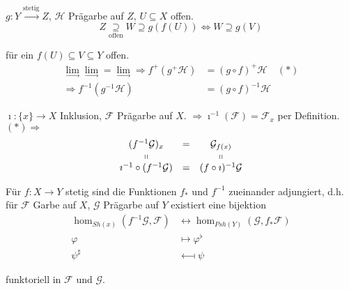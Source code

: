 $g:Y\xrightarrow{\text{stetig}}Z$, $\mathcal{H}$ Prägarbe auf $Z$,
$U\subseteq X$ offen. 
\[
Z\underset{\text{offen}}{\supseteq}W\supseteq g(f(U))\Longleftrightarrow W\supseteq g(V)
\]

für ein $f(U)\subseteq V\subseteq Y$ offen. 
\begin{align*}
  \underset{\longrightarrow}{\lim}\underset{\longrightarrow}{\lim}=\underset{\longrightarrow}{\lim}\Longrightarrow f^{+}(g^{+}\mathcal{H}) & =(g\circ f)^{+}\mathcal{H}\quad(*)\\
  \Longrightarrow f^{-1}(g^{-1}\mathcal{H}) & =(g\circ f)^{-1}\mathcal{H}
\end{align*}

\begin{example}
  $\imath:\{x\}\rightarrow X$ Inklusion, $\mathcal{F}$ Prägarbe auf
  $X$. $\Longrightarrow\imath^{-1}(\mathcal{F})=\mathcal{F}_{x}$ per
  Definition. $(\ast)\Longrightarrow$
  \[
  \begin{array}{ccc}
    (f^{-1}\mathcal{G})_{x} & = & \mathcal{G}_{f(x)}\\
    \shortparallel &  & \shortparallel\\
    \imath^{-1}\circ(f^{-1}\mathcal{G}) & = & (f\circ\imath)^{-1}\mathcal{G}
  \end{array}
  \]
\end{example}

\begin{prop}[29]
  Für $f:X\rightarrow Y$ stetig sind die Funktionen $f_{\ast}$ und
  $f^{-1}$ zueinander adjungiert, d.h. für $\mathcal{F}$ Garbe auf
  $X$, $\mathcal{G}$ Prägarbe auf $Y$ existiert eine bijektion
  \begin{align*}
    \hom_{Sh(x)}(f^{-1}\mathcal{G},\mathcal{F}) & \longleftrightarrow\hom_{Psh(Y)}(\mathcal{G},f_{\ast}\mathcal{F})\\
    \varphi & \longmapsto\varphi^{\flat}\\
    \psi^{\sharp} & \longmapsfrom\psi
  \end{align*}

  funktoriell in $\mathcal{F}$ und $\mathcal{G}$.
\end{prop}

